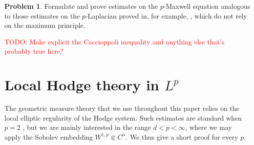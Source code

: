 \documentclass[reqno,11pt]{amsart}
\theoremstyle{definition}
\newtheorem{problem}[theorem]{Problem}
\numberwithin{equation}{section}
\newcommand\todo[1]{\textcolor{red}{TODO: #1}}
\begin{document}
\begin{problem}
Formulate and prove estimates on the $p$-Maxwell equation analogous to those estimates on the $p$-Laplacian proved in, for example, \cite[Chapter 11]{kinnunen2021maximal}, which do not rely on the maximum principle.
\end{problem}

\todo{Make explicit the Caccioppoli inequality and anything else that's probably true here?}



\appendix
\section{Local Hodge theory in \texorpdfstring{$L^p$}{Lp}} \label{local Hodge appendix}
The geometric measure theory that we use throughout this paper relies on the local elliptic regularity of the Hodge system.
Such estimates are standard when $p = 2$ \cite[\S9.5]{taylor2010partial}, but we are mainly interested in the range $d < p < \infty$, where we may apply the Sobolev embedding $W^{1, p} \Subset C^\alpha$.
We thus give a short proof for every $p$.
\end{document}
